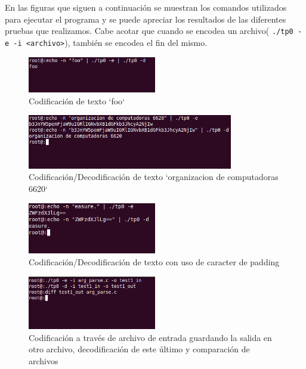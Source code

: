 \documentclass[a4paper,10pt,oneside]{article}
\begin{document}
	En las figuras que siguen a continuación se muestran los comandos utilizados para ejecutar el programa y se puede apreciar los resultados de las diferentes pruebas que realizamos. Cabe acotar que cuando se encodea un archivo( \texttt{./tp0 -e -i <archivo>}), también se encodea el fin del mismo. \newpage
	
	\begin{figure}[H]
		\begin{center}
			\includegraphics[width=0.50\textwidth]{test1.png}
		\end{center}
		\caption{Codificación de texto `foo`} \label{Figura 1}
	\end{figure}

	\begin{figure}[H]
		\begin{center}
			\includegraphics[width=0.80\textwidth]{test2.png}
		\end{center}
		\caption{Codificación/Decodificación de texto `organizacion de computadoras 6620`} \label{Figura 2}
	\end{figure}

	\begin{figure}[H]
		\begin{center}
			\includegraphics[width=0.50\textwidth]{test3.png}
		\end{center}
		\caption{Codificación/Decodificación de texto con uso de caracter de padding} \label{Figura 3}
	\end{figure}
	
	\begin{figure}[H]
		\begin{center}
			\includegraphics[width=0.50\textwidth]{test4.png}
		\end{center}
		\caption{Codificación a través de archivo de entrada guardando la salida en otro archivo, decodificación de este último y comparación de archivos} \label{Figura 4}
	\end{figure}
	
\end{document}
